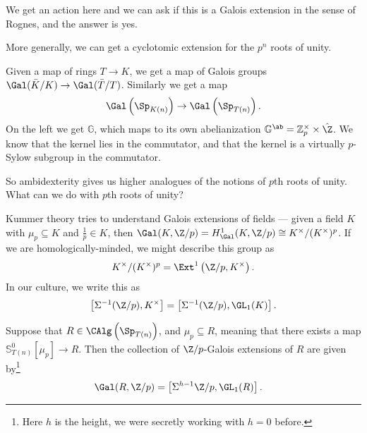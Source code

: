 We get an action here and we can ask if this is a Galois extension in the sense of Rognes, and the answer is yes.

More generally, we can get a cyclotomic extension for the $p^n$ roots of unity.

Given a map of rings $T \to K$, we get a map of Galois groups $\Gal(\bar{K}/K) \to \Gal(\bar{T}/T)$. Similarly we get a map
\begin{align*}
    \Gal \left( \Sp_{K(n)} \right) \to \Gal \left( \Sp_{T(n)} \right).
\end{align*}
On the left we get $\mathbb{G}$, which maps to its own abelianization $\mathbb{G}^\ab = \mathbb{Z}_p^\times \times \hat{\Z}$. We know that the kernel lies in the commutator, and that the kernel is a virtually $p$-Sylow subgroup in the commutator.

So ambidexterity gives us higher analogues of the notions of $p$th roots of unity. What can we do with $p$th roots of unity?

Kummer theory tries to understand Galois extensions of fields --- given a field $K$ with $\mu_p \subseteq K$ and $\frac{1}{p} \in K$, then $\Gal(K, \Z/p) = H^1_\Gal(K,\Z/p) \cong K^\times/(K^\times)^p$. If we are homologically-minded, we might describe this group as
\begin{align*}
    K^\times/(K^\times)^p = \Ext^1 \left( \Z/p, K^\times \right).
\end{align*}
In our culture, we write this as
\begin{align*}
    \left[ \Sigma^{-1} (\Z/p), K^\times \right] = \left[ \Sigma^{-1} (\Z/p), \GL_1(K) \right].
\end{align*}

Suppose that $R \in \CAlg \left( \Sp_{T(n)} \right)$, and $\mu_p \subseteq R$, meaning that there exists a map $\mathbb{S}^0_{T(n)} \left[ \mu_p \right] \to R$. Then the collection of $\Z/p$-Galois extensions of $R$ are given by\footnote{Here $h$ is the height, we were secretly working with $h=0$ before.}
\begin{align*}
    \Gal(R, \Z/p) &= \left[ \Sigma^{h-1} \Z/p, \GL_1(R) \right].
\end{align*}

